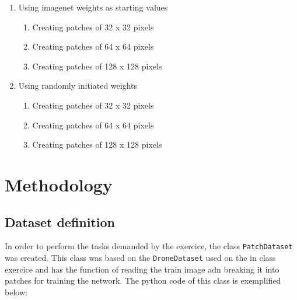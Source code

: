\documentclass[10pt, a4paper]{article}
\begin{document}
\begin{enumerate}
  \item Using imagenet weights as starting values\label{item:1}
  \begin{enumerate}[a]
    \item Creating patches of 32 x 32 pixels\label{item:1a}
    \item Creating patches of 64 x 64 pixels\label{item:1b}
    \item Creating patches of 128 x 128 pixels\label{item:1c}
  \end{enumerate}
  \item Using randomly initiated weights\label{item:2}
  \begin{enumerate}[a]
    \item Creating patches of 32 x 32 pixels\label{item:2a}
    \item Creating patches of 64 x 64 pixels\label{item:2b}
    \item Creating patches of 128 x 128 pixels\label{item:2c}
  \end{enumerate}
\end{enumerate}


\section{Methodology}

\subsection{Dataset definition}

In order to perform the tasks demanded by the exercice, the class {\tt PatchDataset} was created. This class was based on the {\tt DroneDataset} used on 
the in class exercice and has the function of reading the train image adn breaking it into patches for training the network. The python code of this class is 
exemplified below:
\end{document}
